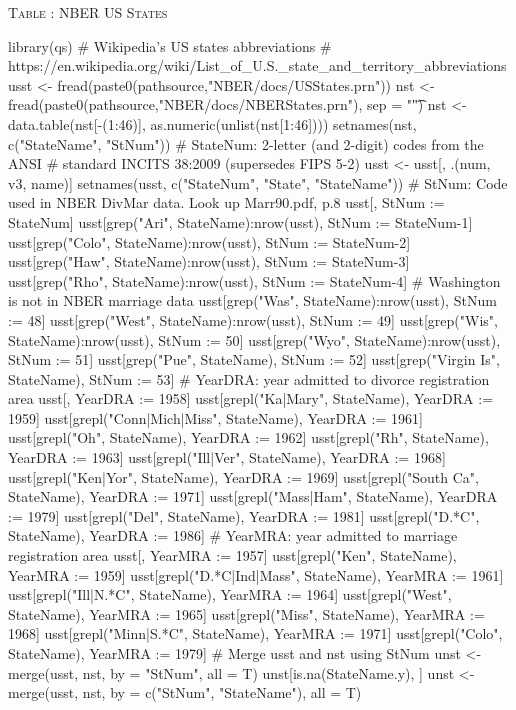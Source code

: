\begin{appendix}
\clearpage
\textsc{Table \thetable: NBER US States}
\begin{Schunk}
\begin{Sinput}
library(qs)
# Wikipedia's US states abbreviations
# https://en.wikipedia.org/wiki/List_of_U.S._state_and_territory_abbreviations
usst <- fread(paste0(pathsource,"NBER/docs/USStates.prn"))
nst <- fread(paste0(pathsource,"NBER/docs/NBERStates.prn"), sep = "\t")
nst <- data.table(nst[-(1:46)], as.numeric(unlist(nst[1:46])))
setnames(nst, c("StateName", "StNum"))
#  StateNum: 2-letter (and 2-digit) codes from the ANSI 
# standard INCITS 38:2009 (supersedes FIPS 5-2)
usst <- usst[, .(num, v3, name)]
setnames(usst, c("StateNum", "State", "StateName"))
# StNum: Code used in NBER DivMar data. Look up Marr90.pdf, p.8
usst[, StNum := StateNum]
usst[grep("Ari", StateName):nrow(usst), StNum := StateNum-1]
usst[grep("Colo", StateName):nrow(usst), StNum := StateNum-2]
usst[grep("Haw", StateName):nrow(usst), StNum := StateNum-3]
usst[grep("Rho", StateName):nrow(usst), StNum := StateNum-4]
# Washington is not in NBER marriage data
usst[grep("Was", StateName):nrow(usst), StNum := 48]
usst[grep("West", StateName):nrow(usst), StNum := 49]
usst[grep("Wis", StateName):nrow(usst), StNum := 50]
usst[grep("Wyo", StateName):nrow(usst), StNum := 51]
usst[grep("Pue", StateName), StNum := 52]
usst[grep("Virgin Is", StateName), StNum := 53]
# YearDRA: year admitted to divorce registration area
usst[, YearDRA := 1958]
usst[grepl("Ka|Mary", StateName), YearDRA := 1959]
usst[grepl("Conn|Mich|Miss", StateName), YearDRA := 1961]
usst[grepl("Oh", StateName), YearDRA := 1962]
usst[grepl("Rh", StateName), YearDRA := 1963]
usst[grepl("Ill|Ver", StateName), YearDRA := 1968]
usst[grepl("Ken|Yor", StateName), YearDRA := 1969]
usst[grepl("South Ca", StateName), YearDRA := 1971]
usst[grepl("Mass|Ham", StateName), YearDRA := 1979]
usst[grepl("Del", StateName), YearDRA := 1981]
usst[grepl("D.*C", StateName), YearDRA := 1986]
# YearMRA: year admitted to marriage registration area
usst[, YearMRA := 1957]
usst[grepl("Ken", StateName), YearMRA := 1959]
usst[grepl("D.*C|Ind|Mass", StateName), YearMRA := 1961]
usst[grepl("Ill|N.*C", StateName), YearMRA := 1964]
usst[grepl("West", StateName), YearMRA := 1965]
usst[grepl("Miss", StateName), YearMRA := 1968]
usst[grepl("Minn|S.*C", StateName), YearMRA := 1971]
usst[grepl("Colo", StateName), YearMRA := 1979]
# Merge usst and nst using StNum
unst <- merge(usst, nst, by = "StNum", all = T)
unst[is.na(StateName.y), ]
unst <- merge(usst, nst, by = c("StNum", "StateName"), all = T)

\end{Sinput}
\end{Schunk}
\end{appendix}
